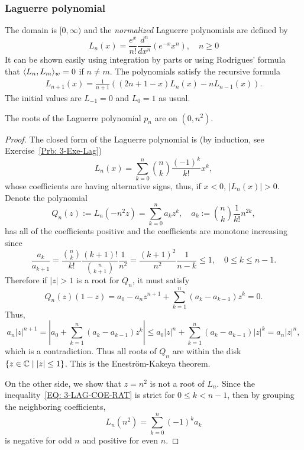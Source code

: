 \subsubsection{Laguerre polynomial}
\label{SSSec: 3-Lagu-Pol}
The domain is $[0,\infty)$ and the \emph{normalized} Laguerre polynomials are defined by 
\begin{equation}
    L_n(x) = \frac{e^x}{n!} \frac{d^n }{dx^n} (e^{-x} x^n), \quad n\ge 0
\end{equation}
It can be shown easily using integration by parts or using Rodrigues' formula that $\langle {L_n, L_m} \rangle_w = 0$ if $n\neq m$. The polynomials satisfy the recursive formula 
\begin{eqnarray}
    L_{n+1}(x) = \frac{1}{n+1}\left((2 n + 1 - x) L_n(x)-n L_{n-1}(x) \right).
\end{eqnarray}
The initial values are $L_{-1} = 0$ and $L_0=1$ as usual. 
\begin{lemma}
    The roots of the Laguerre polynomial $p_n$ are on $(0, n^2)$.
\end{lemma}
\begin{proof}
    The closed form of the Laguerre polynomial is (by induction, see Exercise~\ref{Prb: 3-Exe-Lag})
    \begin{equation}
        L_n(x) = \sum_{k=0}^n \binom{n}{k} \frac{(-1)^k}{k!} x^k,
    \end{equation}
    whose coefficients are having alternative signs, thus,  if $x < 0$, $|L_n(x)| > 0$. Denote the polynomial 
    \begin{equation}
       {Q}_n(z):=  L_n\left( -n^2 z \right) = \sum_{k=0}^n a_k z^k, \quad a_k := \binom{n}{k} \frac{1}{k!} {n^{2k}}, 
    \end{equation}
    has all of the coefficients positive and the coefficients are monotone increasing since 
    \begin{equation}\label{EQ: 3-LAG-COE-RAT}
        \frac{a_k}{a_{k+1}} = \frac{\binom{n}{k}}{k!} \frac{(k+1)!}{\binom{n}{k+1}} \frac{1}{n^2}  = \frac{(k+1)^2}{n^2} \frac{1}{n - k} \le 1,\quad 0\le k \le n- 1.
    \end{equation}
    Therefore if $|z| > 1$ is a root for $Q_n$, it must satisfy $$Q_n(z)(1-z) = a_0 - a_n z^{n+1} + \sum_{k=1}^n (a_k - a_{k-1}) z^k = 0.$$ Thus,  
    \begin{equation}
        a_n |z|^{n+1} = \left| a_0 + \sum_{k=1}^n (a_k - a_{k-1}) z^k\right| \le a_0|z|^n + \sum_{k=1}^n (a_k - a_{k-1}) |z|^k = a_n |z|^n, 
    \end{equation}
    which is a contradiction.  Thus all roots of $Q_n$ are within the disk $\{z\in \mathbb C\mid |z| \le 1\}$. This is the Enestr\"{o}m-Kakeya theorem. 

    On the other side, we show that $z = n^2$ is not a root of $L_n$. Since the inequality~\eqref{EQ: 3-LAG-COE-RAT} is strict for $0\le k<n-1$, then by grouping the neighboring coefficients, 
    \begin{equation}
        L_n(n^2) = \sum_{k=0}^n (-1)^k a_k 
     \end{equation}
     is negative for odd $n$ and positive for even $n$.
\end{proof}
